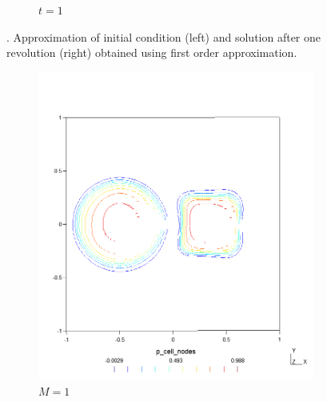 \begin{figure}[h!]
\begin{subfigure}{.5\textwidth}
        \caption{$t = 1$}
    \end{subfigure}
    \caption{.  Approximation of initial condition (left) and
    solution after one revolution (right) obtained using first order approximation.}
    \label{fig:sol_3D_adv2D}
\end{figure}

\begin{figure}[p!]
    \centering
    \begin{subfigure}{.5\textwidth}
        \centering
        \includegraphics[width=\linewidth]{../figs/sols/kriv-sol-h14400o01}
        \caption{$M = 1$}
    \end{subfigure}%
    \begin{subfigure}{.5\textwidth}
        \centering

\end{subfigure}
\end{figure}
